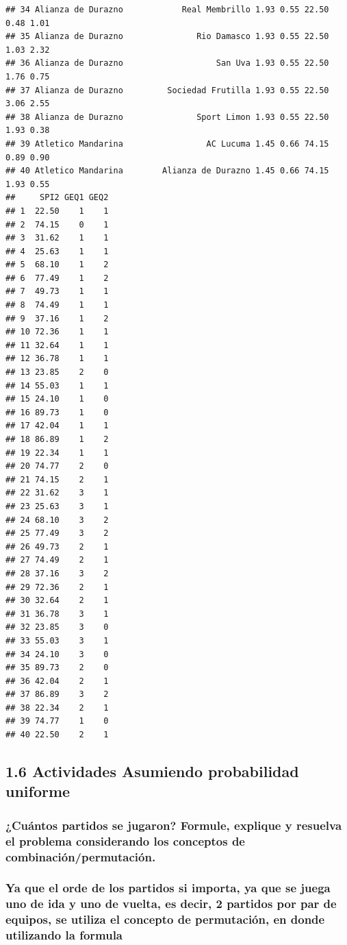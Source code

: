 \documentclass[]{article}
\begin{document}
\begin{verbatim}
## 34 Alianza de Durazno            Real Membrillo 1.93 0.55 22.50 0.48 1.01
## 35 Alianza de Durazno               Rio Damasco 1.93 0.55 22.50 1.03 2.32
## 36 Alianza de Durazno                   San Uva 1.93 0.55 22.50 1.76 0.75
## 37 Alianza de Durazno         Sociedad Frutilla 1.93 0.55 22.50 3.06 2.55
## 38 Alianza de Durazno               Sport Limon 1.93 0.55 22.50 1.93 0.38
## 39 Atletico Mandarina                 AC Lucuma 1.45 0.66 74.15 0.89 0.90
## 40 Atletico Mandarina        Alianza de Durazno 1.45 0.66 74.15 1.93 0.55
##     SPI2 GEQ1 GEQ2
## 1  22.50    1    1
## 2  74.15    0    1
## 3  31.62    1    1
## 4  25.63    1    1
## 5  68.10    1    2
## 6  77.49    1    2
## 7  49.73    1    1
## 8  74.49    1    1
## 9  37.16    1    2
## 10 72.36    1    1
## 11 32.64    1    1
## 12 36.78    1    1
## 13 23.85    2    0
## 14 55.03    1    1
## 15 24.10    1    0
## 16 89.73    1    0
## 17 42.04    1    1
## 18 86.89    1    2
## 19 22.34    1    1
## 20 74.77    2    0
## 21 74.15    2    1
## 22 31.62    3    1
## 23 25.63    3    1
## 24 68.10    3    2
## 25 77.49    3    2
## 26 49.73    2    1
## 27 74.49    2    1
## 28 37.16    3    2
## 29 72.36    2    1
## 30 32.64    2    1
## 31 36.78    3    1
## 32 23.85    3    0
## 33 55.03    3    1
## 34 24.10    3    0
## 35 89.73    2    0
## 36 42.04    2    1
## 37 86.89    3    2
## 38 22.34    2    1
## 39 74.77    1    0
## 40 22.50    2    1
\end{verbatim}

\hypertarget{actividades-asumiendo-probabilidad-uniforme}{%
\subsection{1.6 Actividades Asumiendo probabilidad
uniforme}\label{actividades-asumiendo-probabilidad-uniforme}}

\hypertarget{cuantos-partidos-se-jugaron-formule-explique-y-resuelva-el-problema-considerando-los-conceptos-de-combinacionpermutacion.}{%
\subsubsection{¿Cuántos partidos se jugaron? Formule, explique y
resuelva el problema considerando los conceptos de
combinación/permutación.}\label{cuantos-partidos-se-jugaron-formule-explique-y-resuelva-el-problema-considerando-los-conceptos-de-combinacionpermutacion.}}

\hypertarget{ya-que-el-orde-de-los-partidos-si-importa-ya-que-se-juega-uno-de-ida-y-uno-de-vuelta-es-decir-2-partidos-por-par-de-equipos-se-utiliza-el-concepto-de-permutacion-en-donde-utilizando-la-formula}{%
\subsubsection{Ya que el orde de los partidos si importa, ya que se
juega uno de ida y uno de vuelta, es decir, 2 partidos por par de
equipos, se utiliza el concepto de permutación, en donde utilizando la
formula}\label{ya-que-el-orde-de-los-partidos-si-importa-ya-que-se-juega-uno-de-ida-y-uno-de-vuelta-es-decir-2-partidos-por-par-de-equipos-se-utiliza-el-concepto-de-permutacion-en-donde-utilizando-la-formula}}
\end{document}
